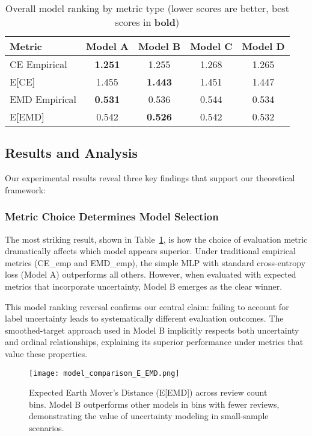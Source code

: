 \documentclass[journal]{IEEEtran}
\begin{document}
\begin{table}[t]
\centering
\small
\caption{Overall model ranking by metric type (lower scores are better, best scores in \textbf{bold})}
\label{tab:model_ranking}
\begin{tabular}{|l|cccc|}
\hline
\textbf{Metric} & \textbf{Model A} & \textbf{Model B} & \textbf{Model C} & \textbf{Model D} \\
\hline
CE Empirical & \textbf{1.251} & 1.255 & 1.268 & 1.265 \\
E[CE] & 1.455 & \textbf{1.443} & 1.451 & 1.447 \\
EMD Empirical & \textbf{0.531} & 0.536 & 0.544 & 0.534 \\
E[EMD] & 0.542 & \textbf{0.526} & 0.542 & 0.532 \\
\hline
\end{tabular}
\end{table}

\subsection{Results and Analysis}

Our experimental results reveal three key findings that support our theoretical framework:

\subsubsection{Metric Choice Determines Model Selection}

The most striking result, shown in Table~\ref{tab:model_ranking}, is how the choice of evaluation metric dramatically affects which model appears superior. Under traditional empirical metrics (CE\_emp and EMD\_emp), the simple MLP with standard cross-entropy loss (Model A) outperforms all others. However, when evaluated with expected metrics that incorporate uncertainty, Model B emerges as the clear winner.

This model ranking reversal confirms our central claim: failing to account for label uncertainty leads to systematically different evaluation outcomes. The smoothed-target approach used in Model B implicitly respects both uncertainty and ordinal relationships, explaining its superior performance under metrics that value these properties.

\begin{figure}[t]
    \centering
    \texttt{[image: model\_comparison\_E\_EMD.png]}
    \caption{Expected Earth Mover's Distance (E[EMD]) across review count bins. Model B outperforms other models in bins with fewer reviews, demonstrating the value of uncertainty modeling in small-sample scenarios.}
    \label{fig:emd_bin_comparison}
\end{figure}
\end{document}
